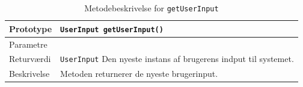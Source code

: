 \begin{table}
\begin{tabularx}{\textwidth}{| L{2.5 cm} | Z |} \hline
Prototype & \texttt{UserInput getUserInput()} \\\hline
Parametre &  ~\newline \\\hline
Returværdi &  \texttt{UserInput} \newline Den nyeste instans af brugerens indput til systemet. \\\hline
Beskrivelse & Metoden returnerer de nyeste brugerinput. \\\hline
\end{tabularx}
\caption{Metodebeskrivelse for \texttt{getUserInput}}
\label{table:met_getUserInput}
\end{table}
